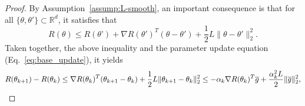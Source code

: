 \documentclass{article}
\begin{document}
\begin{proof}
By Assumption~\ref{assump:L-smooth}, an important consequence is that for all $\{\theta, \theta'\} \subset \mathbb{R}^d$, it satisfies that
\begin{equation}
    R(\theta) \leq R(\theta’) + \nabla R(\theta')^T(\theta-\theta') + \frac{1}{2}L\|\theta-\theta'\|_2^2. 
\end{equation}
Taken together, the above inequality and the parameter update equation (Eq.~\ref{eq:base_update}), it yields 
\begin{equation}\label{eq:substact}
    R(\theta_{k+1}) - R(\theta_k)  \leq \nabla R(\theta_k)^{T}(\theta_{k+1}-\theta_k) + \frac{1}{2}L\|\theta_{k+1} - \theta_{k}\|_2^{2} \\
                                   \leq - \alpha_k\nabla R(\theta_k)^{T}\overline{g} + \frac{\alpha_k^2 L}{2}\|\overline{g}\|_2^2,
\end{equation}


\end{proof}
\end{document}
